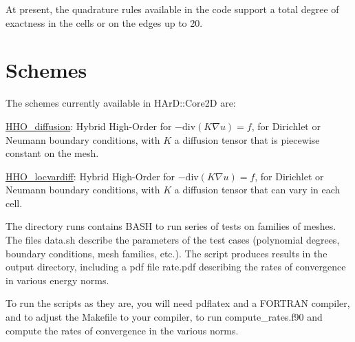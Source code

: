 At present, the quadrature rules available in the code support a total degree of exactness in the cells or on the edges up to 20.

\label{_schemes}%
 \hypertarget{index_schemes}{}\section{Schemes}\label{index_schemes}
The schemes currently available in H\+Ar\+D\+::\+Core2D are\+:


\begin{DoxyItemize}
\item \hyperlink{classHArDCore2D_1_1HHO__Diffusion}{H\+H\+O\+\_\+diffusion}\+: Hybrid High-\/\+Order for $-\mathrm{div}(K\nabla u)=f$, for Dirichlet or Neumann boundary conditions, with $K$ a diffusion tensor that is piecewise constant on the mesh.
\item \hyperlink{classHArDCore2D_1_1HHO__LocVarDiff}{H\+H\+O\+\_\+locvardiff}\+: Hybrid High-\/\+Order for $-\mathrm{div}(K\nabla u)=f$, for Dirichlet or Neumann boundary conditions, with $K$ a diffusion tensor that can vary in each cell.
\end{DoxyItemize}

The directory {\ttfamily runs} contains B\+A\+SH to run series of tests on families of meshes. The files {\ttfamily data.\+sh} describe the parameters of the test cases (polynomial degrees, boundary conditions, mesh families, etc.). The script produces results in the {\ttfamily output} directory, including a pdf file {\ttfamily rate.\+pdf} describing the rates of convergence in various energy norms.

To run the scripts as they are, you will need {\ttfamily pdflatex} and a F\+O\+R\+T\+R\+AN compiler, and to adjust the {\ttfamily Makefile} to your compiler, to run {\ttfamily compute\+\_\+rates.\+f90} and compute the rates of convergence in the various norms. 